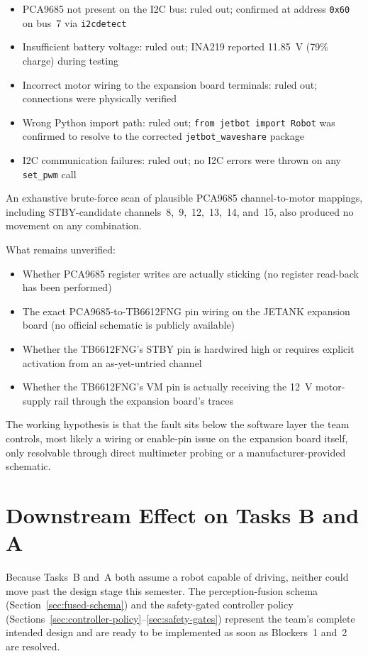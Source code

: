 \documentclass{imc-inf}
\begin{document}
\begin{itemize}
\item PCA9685 not present on the I2C bus: ruled out; confirmed at address
\texttt{0x60} on bus~7 via \texttt{i2cdetect}
\item Insufficient battery voltage: ruled out; INA219 reported 11.85~V
(79\% charge) during testing
\item Incorrect motor wiring to the expansion board terminals: ruled out;
connections were physically verified
\item Wrong Python import path: ruled out; \texttt{from jetbot import Robot}
was confirmed to resolve to the corrected \texttt{jetbot\_waveshare} package
\item I2C communication failures: ruled out; no I2C errors were thrown
on any \texttt{set\_pwm} call
\end{itemize}

An exhaustive brute-force scan of plausible PCA9685 channel-to-motor mappings,
including STBY-candidate channels~8,~9,~12,~13,~14, and~15, also produced no
movement on any combination.

What remains unverified:
\begin{itemize}
\item Whether PCA9685 register writes are actually sticking (no register read-back
has been performed)
\item The exact PCA9685-to-TB6612FNG pin wiring on the JETANK expansion board
(no official schematic is publicly available)
\item Whether the TB6612FNG's STBY pin is hardwired high or requires explicit
activation from an as-yet-untried channel
\item Whether the TB6612FNG's VM pin is actually receiving the 12~V motor-supply
rail through the expansion board's traces
\end{itemize}

The working hypothesis is that the fault sits below the software layer the team
controls, most likely a wiring or enable-pin issue on the expansion board itself,
only resolvable through direct multimeter probing or a manufacturer-provided
schematic.

\section{Downstream Effect on Tasks B and A}
\label{sec:downstream-effect}

Because Tasks~B and~A both assume a robot capable of driving, neither could move
past the design stage this semester. The perception-fusion schema
(Section~\ref{sec:fused-schema}) and the safety-gated controller policy
(Sections~\ref{sec:controller-policy}--\ref{sec:safety-gates}) represent the team's
complete intended design and are ready to be implemented as soon as Blockers~1
and~2 are resolved.
\end{document}
